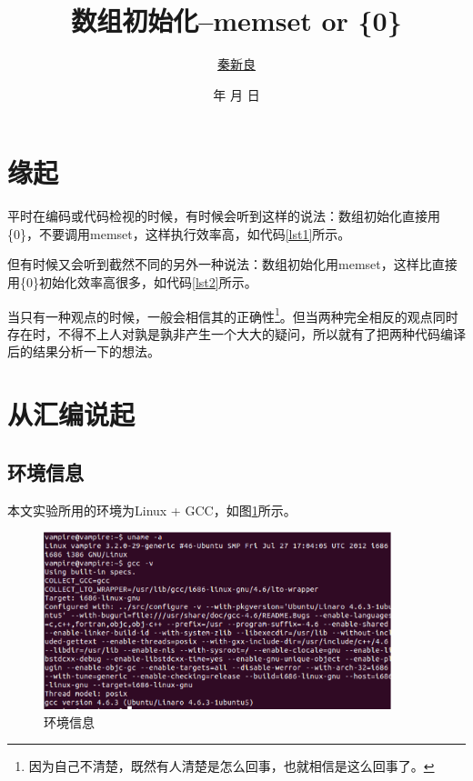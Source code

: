\documentclass[a4paper, 12pt, titlepage]{article}
\newcommand*{\TitleFont}{\usefont{\encodingdefault}{\rmdefault}{b}{n}\fontsize{32}{40}\selectfont\CJKfamily{title}\color{seco}}%
\renewcommand{\today}{\color{seco}\number\year 年 \number\month 月 \number\day 日}
\begin{document}
\setlength{\parindent}{2em}

\title{\TitleFont 数组初始化--memset or \{0\}\vspace{8cm}}
\author{\href{mailto:q00148943@gmail.com}{\LARGE{秦新良}}}
\date{\vspace{0.5cm}\today}

\maketitle

\tableofcontents
\newpage
\section{缘起}
平时在编码或代码检视的时候，有时候会听到这样的说法：数组初始化直接用\{0\}，不要调用memset，这样执行效率高，如代码\ref{lst1}所示。
\begin{spacing}{1.0}

\end{spacing}
但有时候又会听到截然不同的另外一种说法：数组初始化用memset，这样比直接用\{0\}初始化效率高很多，如代码\ref{lst2}所示。
\begin{spacing}{1.0}

\end{spacing}


当只有一种观点的时候，一般会相信其的正确性\footnote{因为自己不清楚，既然有人清楚是怎么回事，也就相信是这么回事了。}。但当两种完全相反的观点同时存在时，不得不上人对孰是孰非产生一个大大的疑问，所以就有了把两种代码编译后的结果分析一下的想法。

\section{从汇编说起}
\subsection{环境信息}
本文实验所用的环境为Linux + GCC，如图\ref{fig1}所示。
\begin{figure}[!htb]
  \setlength{\abovecaptionskip}{0pt}
  \centering
  \includegraphics[width=0.90\textwidth]{env.eps}
  \caption{环境信息}
  \label{fig1}
\end{figure}
\end{document}
